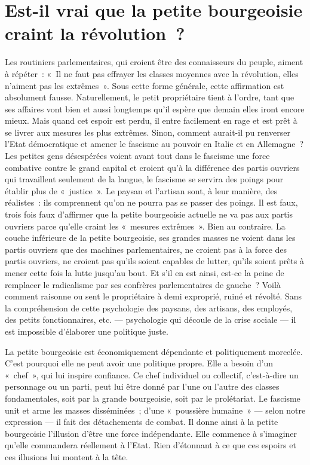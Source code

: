 \documentclass[french,twoside]{book} %
\begin{document}
\section[{Est-il vrai que la petite bourgeoisie craint la révolution ?}]{Est-il vrai que la petite bourgeoisie craint la révolution ?}
\noindent Les routiniers parlementaires, qui croient être des connaisseurs du peuple, aiment à répéter : « Il ne faut pas effrayer les classes moyennes avec la révolution, elles n’aiment pas les extrêmes ». Sous cette forme générale, cette affirmation est absolument fausse. Naturellement, le petit propriétaire tient à l’ordre, tant que ses affaires vont bien et aussi longtemps qu’il espère que demain elles iront encore mieux. Mais quand cet espoir est perdu, il entre facilement en rage et est prêt à se livrer aux mesures les plus extrêmes. Sinon, comment aurait-il pu renverser l’Etat démocratique et amener le fascisme au  pouvoir en Italie et en Allemagne ? Les petites gens désespérées voient avant tout dans le fascisme une force combative contre le grand capital et croient qu’à la différence des partis ouvriers qui travaillent seulement de la langue, le fascisme se servira des poings pour établir plus de « justice ». Le paysan et l’artisan sont, à leur manière, des réalistes : ils comprennent qu’on ne pourra pas se passer des poings. Il est faux, trois fois faux d’affirmer que la petite bourgeoisie actuelle ne va pas aux partis ouvriers parce qu’elle craint les « mesures extrêmes ». Bien au contraire. La couche inférieure de la petite bourgeoisie, ses grandes masses ne voient dans les partis ouvriers que des machines parlementaires, ne croient pas à la force des partis ouvriers, ne croient pas qu’ils soient capables de lutter, qu’ils soient prêts à mener cette fois la lutte jusqu’au bout. Et s’il en est ainsi, est-ce la peine de remplacer le radicalisme par ses confrères parlementaires de gauche ? Voilà comment raisonne ou sent le propriétaire à demi exproprié, ruiné et révolté. Sans la compréhension de cette psychologie des paysans, des artisans, des employés, des petits fonctionnaires, etc. — psychologie qui découle de la crise sociale — il est impossible d’élaborer une politique juste.\par
La petite bourgeoisie est économiquement dépendante et politiquement morcelée. C’est pourquoi elle ne peut avoir une politique propre. Elle a besoin d’un « chef », qui lui inspire confiance. Ce chef individuel ou collectif, c’est-à-dire un personnage ou un parti, peut lui être donné par l’une ou l’autre des classes fondamentales, soit par la grande bourgeoisie, soit par le prolétariat. Le fascisme unit et arme les masses disséminées ; d’une « poussière humaine » — selon notre expression — il fait des détachements de combat. Il donne ainsi à la petite bourgeoisie l’illusion d’être une force indépendante. Elle commence à s’imaginer qu’elle commandera réellement à  l’Etat. Rien d’étonnant à ce que ces espoirs et ces illusions lui montent à la tête.\par
\end{document}
